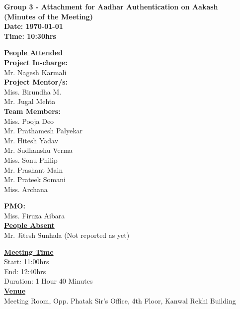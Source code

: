 \documentclass[a4paper,12pt]{article}
\begin{document}
\LARGE
\begin{center}
\textbf
{
Group 3 - Attachment for Aadhar Authentication on Aakash\\
(Minutes of the Meeting) \\ 
Date: \today \\
Time: 10:30hrs
}
\end{center}

\vfill

\large

\underline{\textbf{People Attended}} \\ 

\indent \textbf{Project In-charge:} \\
\indent Mr. Nagesh Karmali \\

\indent \textbf{Project Mentor/s:} \\
\indent Miss. Birundha M.\\
\indent Mr. Jugal Mehta \\

\indent \textbf{Team Members:} \\
\indent Miss. Pooja Deo \\
\indent Mr. Prathamesh Palyekar \\
\indent Mr. Hitesh Yadav \\
\indent Mr. Sudhanshu Verma \\
\indent Miss. Sonu Philip \\
\indent Mr. Prashant Main \\
\indent Mr. Prateek Somani \\
\indent Miss. Archana

\indent \textbf{PMO:} \\
\indent Miss. Firuza Aibara\\

\underline{\textbf{People Absent}} \\ 
\indent Mr. Jitesh Sunhala (Not reported as yet)

\vskip20pt
\underline{\textbf{Meeting Time}} \\
\indent Start: 11:00hrs \\
\indent End: 12:40hrs \\
\indent Duration: 1 Hour 40 Minutes \\



\underline{\textbf{Venue}} \\
\indent Meeting Room, Opp. Phatak Sir's Office, 4th Floor, Kanwal Rekhi Building
\end{document}
